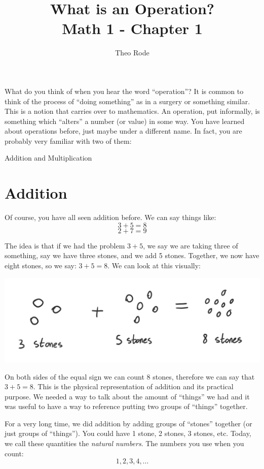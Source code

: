 \documentclass{article}
\title{\textbf{What is an Operation?} \\ \large Math 1 - Chapter 1}
\author{Theo Rode}
\date{}
\begin{document}
\maketitle


What do you think of when you hear the word ``operation''? It is common to think of the process of ``doing something'' as in a surgery or something similar. This is a notion that carries over to mathematics. An operation, put informally, is something which ``alters'' a number (or value) in some way. You have learned about operations before, just maybe under a different name. In fact, you are probably very familiar with two of them:
\begin{center}
    Addition and Multiplication
\end{center}

\section*{Addition}

Of course, you have all seen addition before. We can say things like: 
\[ 3 + 5 = 8\]
\[ 2 + 7 = 9 \]

The idea is that if we had the problem $3+5$, we say we are taking three of something, say we have three stones, and we add 5 stones. Together, we now have eight stones, so we say: $3+5 = 8$. We can look at this visually: 

\begin{center}
    \includegraphics[scale=0.5]{chap1images/chapter1_draw1.png}
\end{center}

On both sides of the equal sign we can count 8 stones, therefore we can say that $3+5=8$. This is the physical representation of addition and its practical purpose. We needed a way to talk about the amount of ``things'' we had and it was useful to have a way to reference putting two groups of ``things'' together. 

For a very long time, we did addition by adding groups of ``stones'' together (or just groups of ``things''). You could have 1 stone, 2 stones, 3 stones, etc. Today, we call these quantities the \textit{natural numbers}. The numbers you use when you count: 
\[ 1, 2, 3, 4, \ldots \]
\end{document}
